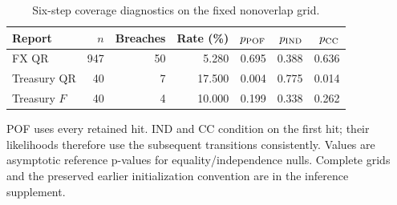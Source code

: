 \begin{table}[!htbp]
\centering\small
\caption{Six-step coverage diagnostics on the fixed nonoverlap grid.}\label{tab:coverage}
\begin{tabular}{lrrrrrr}
\toprule
Report & $n$ & Breaches & Rate (\%) & $p_{\rm POF}$ & $p_{\rm IND}$ & $p_{\rm CC}$ \\
\midrule
FX QR & 947 & 50 & 5.280 & 0.695 & 0.388 & 0.636 \\
Treasury QR & 40 & 7 & 17.500 & 0.004 & 0.775 & 0.014 \\
Treasury $F$ & 40 & 4 & 10.000 & 0.199 & 0.338 & 0.262 \\
\bottomrule
\end{tabular}
\par\smallskip\begin{minipage}{\linewidth}\footnotesize POF uses every retained hit. IND and CC condition on the first hit; their likelihoods therefore use the subsequent transitions consistently. Values are asymptotic reference p-values for equality/independence nulls. Complete grids and the preserved earlier initialization convention are in the inference supplement.\end{minipage}
\end{table}
